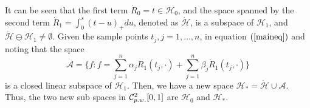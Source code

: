 It can be seen that the first term $\dot{R}_0=t\in \mathcal{H}_0$, and the space spanned by the second term $\dot{R}_1=\int_0^s(t-u)_+du$, denoted as $\mathcal{\dot{H}}$, is a subspace of $\mathcal{H}_1$, and $\mathcal{\dot{H}} \ominus \mathcal{H}_1\neq \emptyset$. Given the sample points $t_j, j=1, \ldots, n$, in equation $(\ref{maineq})$ and noting that the space
\begin{equation*}
\mathcal{A}=\{f: f=\sum_{j=1}^{n}\alpha_jR_1(t_j,\cdot)+\sum_{j=1}^{n}\beta_j\dot{R}_1(t_j,\cdot)\} 
\end{equation*}
is a closed linear subspace of $\mathcal{H}_1$. Then, we have a new space $\mathcal{H}_*=\mathcal{\dot{H}} \cup \mathcal{A}$. Thus, the two new sub spaces in $\mathcal{C}_{\footnotesize p.w.}^2[0,1]$ are $\mathcal{H}_0$ and $\mathcal{H}_*$.


